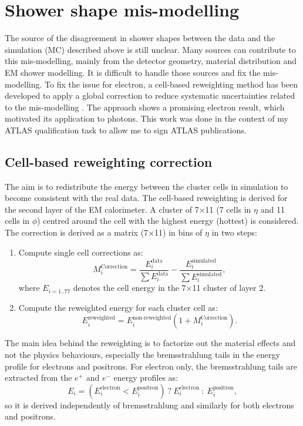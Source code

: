 \section{Shower shape mis-modelling}
\label{gamma:ss}
The source of the disagreement in shower shapes between the data and the simulation (MC) described above is still unclear. Many sources can contribute to this mis-modelling, mainly from the detector geometry, material distribution and EM shower modelling. It is difficult to handle those sources and fix the mis-modelling. To fix the issue for electron, a cell-based reweighting method has been developed to apply a global correction to reduce systematic uncertainties related to the mis-modelling \cite{xu, khandoga}. The approach shows a promising electron result, which motivated its application to photons. This work was done in the context of my ATLAS qualification task to allow me to sign ATLAS publications.

\subsection{Cell-based reweighting correction}
\label{gamma:ss:reweighting}
The aim is to redistribute the energy between the cluster cells in simulation to become consistent with the real data. The cell-based reweighting is derived for the second layer of the EM calorimeter. A cluster of 7$\times$11 (7 cells in $\eta$ and 11 cells in $\phi$) centred around the cell with the highest energy (hottest) is considered. The correction is derived as a matrix (7$\times$11) in bins of $\eta$ in two steps:
\begin{enumerate}
    \item Compute single cell corrections as: 
    \begin{equation}
        M_{i}^{\text{Correction}} = \frac{E_{i}^{\text{data}}}{\sum E_{i}^{\text{data}}} -  \frac{E_{i}^{\text{simulated}}}{\sum E_{i}^{\text{simulated}}},
    \end{equation}
    where $E_{i = 1 .. 77}$ denotes the cell energy in the 7$\times$11 cluster of layer 2. 
    \item Compute the reweighted energy for each cluster cell as: 
    \begin{equation}
        E_{i}^{\text{reweighted}} = E_{i}^{\text{non-reweighted}}(1+M_{i}^{\text{Correction}}).
    \end{equation}
\end{enumerate}
The main idea behind the reweighting is to factorize out the material effects and not the physics behaviours, especially the bremsstrahlung tails in the energy profile for electrons and positrons. For electron only, the bremsstrahlung tails are extracted from the $e^+$ and $e^-$ energy profiles as: 
\begin{equation}
    E_{i} = (E_{i}^{\text{electron}} <  E_{i}^{\text{positron}}) \ ? \ E_{i}^{\text{electron}} \ : \  E_{i}^{\text{positron}},
\end{equation}
so it is derived independently of bremsstrahlung and similarly for both electrons and positrons.


